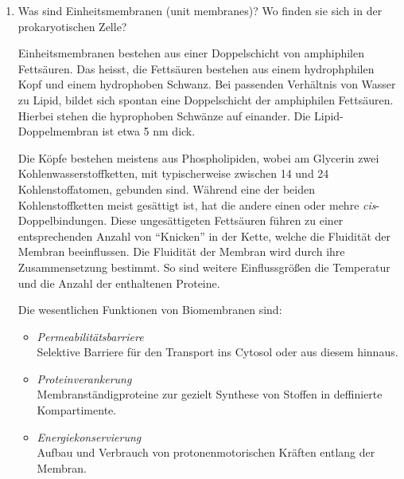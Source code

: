 \begin{enumerate}
		\item Was sind Einheitsmembranen (unit membranes)? Wo finden sie sich in der prokaryotischen Zelle?

			Einheitsmembranen bestehen aus einer Doppelschicht von amphiphilen Fettsäuren.
			Das heisst, die Fettsäuren bestehen aus einem hydrophphilen Kopf und einem hydrophoben Schwanz.
			Bei passenden Verhältnis von Wasser zu Lipid, bildet sich spontan eine Doppelschicht der amphiphilen Fettsäuren.
			Hierbei stehen die hyprophoben Schwänze auf einander.
			Die Lipid-Doppelmembran ist etwa 5 nm dick.
		
			Die Köpfe bestehen meistens aus Phospholipiden,
			wobei am Glycerin zwei Kohlenwasserstoffketten,
			mit typischerweise zwischen 14 und 24 Kohlenstoffatomen,
			gebunden sind.
			Während eine der beiden Kohlenstoffketten meist gesättigt ist,
			hat die andere einen oder mehre \textit{cis}-Doppelbindungen.
			Diese ungesättigeten Fettsäuren führen zu einer entsprechenden Anzahl von ``Knicken'' in der Kette,
			welche die Fluidität der Membran beeinflussen.
			Die Fluidität der Membran wird durch ihre Zusammensetzung bestimmt.
			So sind weitere Einflussgrößen die Temperatur und
			die Anzahl der enthaltenen Proteine.

			Die wesentlichen Funktionen von Biomembranen sind:

			\begin{itemize}
				\item \emph{Permeabilitätsbarriere} \hfill \\
				Selektive Barriere für den Transport ins Cytosol oder aus diesem hinnaus.
				\item\emph{Proteinverankerung} \hfill \\
				Membranständigproteine zur gezielt Synthese von Stoffen in deffinierte Kompartimente.
				\item\emph{Energiekonservierung} \hfill \\
				Aufbau und Verbrauch von protonenmotorischen Kräften entlang der Membran.
			\end{itemize}


\end{enumerate}
